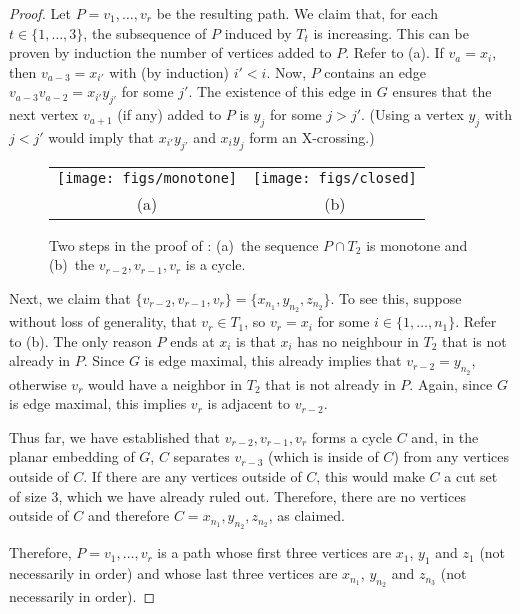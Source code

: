 \documentclass{patmorin}
\begin{document}
\begin{proof}
  Let $P=v_1,\ldots,v_r$ be the resulting path.  We claim that, for
  each $t\in \{1,\ldots,3\}$, the subsequence of $P$ induced by $T_t$
  is increasing. This can be proven by induction the number of vertices
  added to $P$. Refer to (a).  If $v_a=x_i$, then $v_{a-3}=x_{i'}$ with (by induction)
  $i'< i$.  Now, $P$ contains an edge $v_{a-3}v_{a-2}=x_{i'}y_{j'}$ for
  some $j'$.  The existence of this edge in $G$ ensures that the next
  vertex $v_{a+1}$ (if any) added to $P$ is $y_j$ for some $j > j'$.
  (Using a vertex $y_j$ with $j < j'$ would imply that $x_{i'}y_{j'}$
  and $x_iy_j$ form an X-crossing.)

  \begin{figure}
    \begin{center}
       \begin{tabular}{cc}
         \texttt{[image: figs/monotone]} & \texttt{[image: figs/closed]} \\
         (a) & (b)
       \end{tabular}
    \end{center}
    \caption{Two steps in the proof of : (a)~the sequence $P\cap T_2$ is monotone and (b)~the $v_{r-2},v_{r-1},v_r$ is a cycle.}
  \end{figure}


  Next, we claim that
  $\{v_{r-2},v_{r-1},v_{r}\}=\{x_{n_1},y_{n_2},z_{n_2}\}$. To see this,
  suppose without loss of generality, that $v_r\in T_1$, so $v_r=x_i$
  for some $i\in\{1,\ldots,n_1\}$. Refer to (b). The only reason $P$ ends at $x_i$
  is that $x_i$ has no neighbour in $T_{2}$ that is not already in $P$.
  Since $G$ is edge maximal, this already implies that $v_{r-2}=y_{n_2}$,
  otherwise $v_r$ would have a neighbor in $T_2$ that is not already
  in $P$.  Again, since $G$ is edge maximal, this implies $v_r$ is
  adjacent to $v_{r-2}$.


  Thus far, we have established that $v_{r-2},v_{r-1},v_{r}$ forms a
  cycle $C$ and, in the planar embedding of $G$, $C$ separates $v_{r-3}$
  (which is inside of $C$) from any vertices outside of $C$.  If there
  are any vertices outside of $C$, this would make $C$ a cut set of size
  3, which we have already ruled out. Therefore, there are no vertices
  outside of $C$ and therefore $C=x_{n_1},y_{n_2},z_{n_2}$, as claimed.

  Therefore, $P=v_1,\ldots,v_r$ is a path whose first three vertices
  are $x_1$, $y_1$ and $z_1$ (not necessarily in order) and whose last
  three vertices are $x_{n_1}$, $y_{n_2}$ and $z_{n_3}$ (not necessarily
  in order).


\end{proof}
\end{document}
